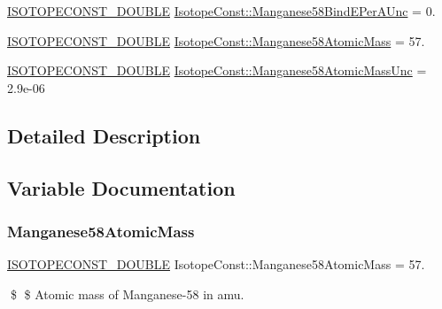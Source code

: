 \begin{DoxyCompactItemize}
\mbox{\hyperlink{group___isotope_const-_macros_ga8f45a7272ce02c0b4c65c44636ed719a}{I\+S\+O\+T\+O\+P\+E\+C\+O\+N\+S\+T\+\_\+\+D\+O\+U\+B\+LE}} \mbox{\hyperlink{group___isotope_const-_manganese-_mn58_gae5463b46718444190d2ad02615420e73}{Isotope\+Const\+::\+Manganese58\+Bind\+E\+Per\+A\+Unc}} = 0.
\item 
\mbox{\hyperlink{group___isotope_const-_macros_ga8f45a7272ce02c0b4c65c44636ed719a}{I\+S\+O\+T\+O\+P\+E\+C\+O\+N\+S\+T\+\_\+\+D\+O\+U\+B\+LE}} \mbox{\hyperlink{group___isotope_const-_manganese-_mn58_ga06cd99d9f98a41a4f56ee6d180696e96}{Isotope\+Const\+::\+Manganese58\+Atomic\+Mass}} = 57.
\item 
\mbox{\hyperlink{group___isotope_const-_macros_ga8f45a7272ce02c0b4c65c44636ed719a}{I\+S\+O\+T\+O\+P\+E\+C\+O\+N\+S\+T\+\_\+\+D\+O\+U\+B\+LE}} \mbox{\hyperlink{group___isotope_const-_manganese-_mn58_ga6295acc89f9321dbb6bffb0368e42de9}{Isotope\+Const\+::\+Manganese58\+Atomic\+Mass\+Unc}} = 2.\+9e-\/06
\end{DoxyCompactItemize}


\subsection{Detailed Description}


\subsection{Variable Documentation}
\mbox{\label{group___isotope_const-_manganese-_mn58_ga06cd99d9f98a41a4f56ee6d180696e96}} 
\subsubsection{\texorpdfstring{Manganese58\+Atomic\+Mass}{Manganese58AtomicMass}}
{\footnotesize\ttfamily \mbox{\hyperlink{group___isotope_const-_macros_ga8f45a7272ce02c0b4c65c44636ed719a}{I\+S\+O\+T\+O\+P\+E\+C\+O\+N\+S\+T\+\_\+\+D\+O\+U\+B\+LE}} Isotope\+Const\+::\+Manganese58\+Atomic\+Mass = 57.}

\$ \$ Atomic mass of Manganese-\/58 in amu. \mbox{\label{group___isotope_const-_manganese-_mn58_ga6295acc89f9321dbb6bffb0368e42de9}} 
